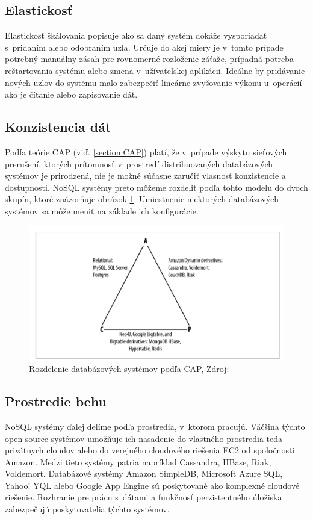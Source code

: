 \documentclass[11pt,twoside,a4paper]{book}
\begin{document}
\subsection{Elastickosť}
Elastickosť škálovania popisuje ako sa daný systém dokáže vysporiadať s~pridaním alebo odobraním uzla. Určuje do akej miery je v~tomto prípade potrebný manuálny zásah pre rovnomerné rozloženie záťaže, prípadná potreba reštartovania systému alebo zmena v~užívateľskej aplikácii. Ideálne by pridávanie nových uzlov do systému malo zabezpečiť lineárne zvyšovanie výkonu u~operácií ako je čítanie alebo zapisovanie dát.


\subsection{Konzistencia dát}
Podľa teórie CAP (viď. \ref{section:CAP}) platí, že v~prípade výskytu sieťových prerušení, ktorých prítomnosť v~prostredí distribuovaných databázových systémov je prirodzená, nie je možné súčasne zaručiť vlasnosť konzistencie a dostupnosti. NoSQL systémy preto môžeme rozdeliť podľa tohto modelu do dvoch skupín, ktoré znázorňuje obrázok \ref{fig:scalling2}. Umiestnenie niektorých databázových systémov sa môže meniť na základe ich konfigurácie. 

\begin{figure}[h]
 \centering
 \includegraphics[width=13cm]{./figures/capDatabases.png}
 \caption{Rozdelenie databázových systémov podľa CAP, Zdroj: \cite{hewitt2010cassandra}}
 \label{fig:scalling2}
\end{figure}


\subsection{Prostredie behu}
NoSQL systémy ďalej delíme  podľa prostredia, v~ktorom pracujú. Väčšina týchto open source systémov umožňuje ich nasadenie do vlastného prostredia teda privátnych cloudov alebo do verejného cloudového riešenia EC2 od spoločnosti Amazon. Medzi tieto systémy patria napríklad Cassandra, HBase, Riak, Voldemort. Databázové systémy Amazon SimpleDB, Microsoft Azure SQL, Yahoo! YQL alebo Google App Engine sú poskytované ako komplexné cloudové riešenie. Rozhranie pre prácu s~dátami a funkčnosť perzistentného úložiska zabezpečujú poskytovatelia týchto systémov.
\end{document}
